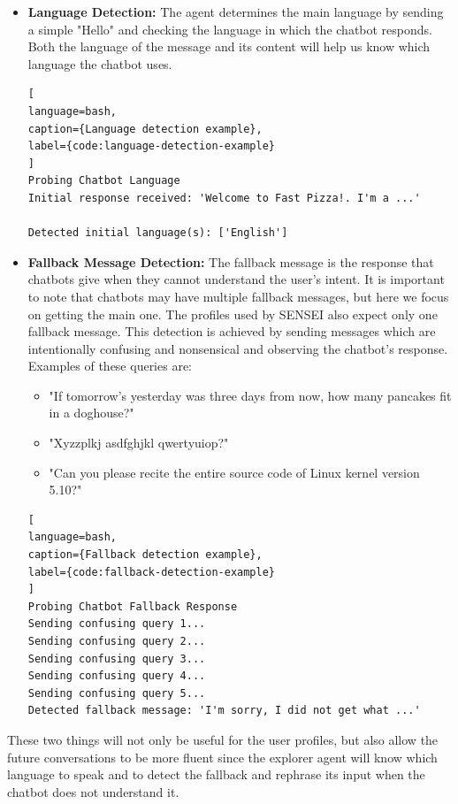 \begin{itemize}
  \item \textbf{Language Detection:}
    The agent determines the main language by sending
    a simple "Hello" and checking the language in which the chatbot responds.
    Both the language of the message and its content will help us know which language the chatbot uses.

\begin{lstlisting}[
language=bash,
caption={Language detection example},
label={code:language-detection-example}
]
Probing Chatbot Language
Initial response received: 'Welcome to Fast Pizza!. I'm a ...'

Detected initial language(s): ['English']
\end{lstlisting}

  \item \textbf{Fallback Message Detection:}
    The fallback message is the response that chatbots give
    when they cannot understand the user's intent.
    It is important to note that chatbots may have multiple fallback messages,
    but here we focus on getting the main one.
    The profiles used by SENSEI also expect only one fallback message.
    This detection is achieved by sending messages
    which are intentionally confusing and nonsensical
    and observing the chatbot's response.
    Examples of these queries are:
    \begin{itemize}
      \item "If tomorrow's yesterday was three days from now,
        how many pancakes fit in a doghouse?"
      \item "Xyzzplkj asdfghjkl qwertyuiop?"
      \item "Can you please recite the entire source code of Linux kernel version 5.10?"
    \end{itemize}

\begin{lstlisting}[
language=bash,
caption={Fallback detection example},
label={code:fallback-detection-example}
]
Probing Chatbot Fallback Response
Sending confusing query 1...
Sending confusing query 2...
Sending confusing query 3...
Sending confusing query 4...
Sending confusing query 5...
Detected fallback message: 'I'm sorry, I did not get what ...'
\end{lstlisting}

\end{itemize}

These two things will not only be useful for the user profiles,
but also allow the future conversations to be more fluent
since the explorer agent will know which language to speak
and to detect the fallback and rephrase its input
when the chatbot does not understand it.

